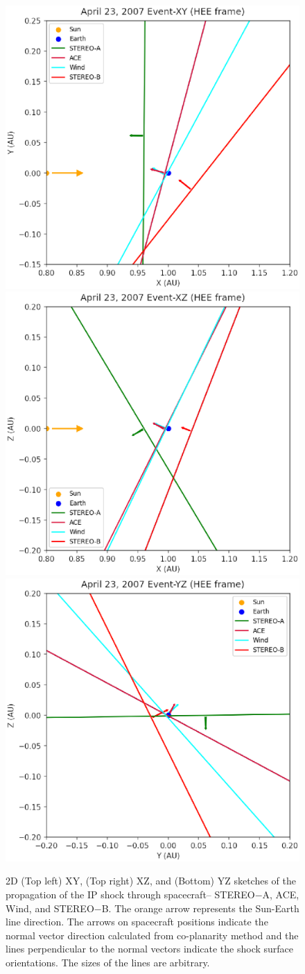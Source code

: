 \documentclass[draft]{agujournal2019}
\begin{document}
\pagebreak


\begin{figure}
\centering
\includegraphics[width=.35\linewidth]{jgr-2023-ipshocks-f26a.eps}
\includegraphics[width=.35\linewidth]{jgr-2023-ipshocks-f26b.eps}
\includegraphics[width=.35\linewidth]{jgr-2023-ipshocks-f26c.eps}
\caption{2D (Top left) XY, (Top right) XZ, and (Bottom) YZ sketches of the propagation of the IP shock through spacecraft-- STEREO$-$A, ACE, Wind, and STEREO$-$B. The orange arrow represents the Sun-Earth line direction. The arrows on spacecraft positions indicate the normal vector direction calculated from co-planarity method and the lines perpendicular to the normal vectors indicate the shock surface orientations. The sizes of the lines are arbitrary.\label{fig:04232D}}
\end{figure}
\end{document}
